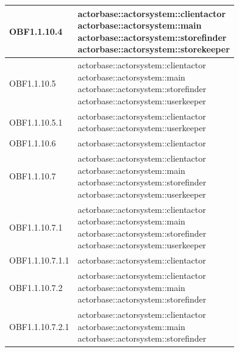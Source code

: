 \documentclass{scalatekids-article}
\begin{document}
\begin{longtable}[H]{|p{3.5cm}|p{7.5cm}|}
  \hline
  OBF1.1.10.4 & \multiLineCell[t]{actorbase::actorsystem::clientactor\\actorbase::actorsystem::main\\actorbase::actorsystem::storefinder\\actorbase::actorsystem::storekeeper\\}\\
  \hline
  OBF1.1.10.5 & \multiLineCell[t]{actorbase::actorsystem::clientactor\\actorbase::actorsystem::main\\actorbase::actorsystem::storefinder\\actorbase::actorsystem::userkeeper\\}\\
  \hline
  OBF1.1.10.5.1 & \multiLineCell[t]{actorbase::actorsystem::clientactor\\actorbase::actorsystem::userkeeper\\}\\
  \hline
  OBF1.1.10.6 & \multiLineCell[t]{actorbase::actorsystem::clientactor\\}\\
  \hline
  OBF1.1.10.7 & \multiLineCell[t]{actorbase::actorsystem::clientactor\\actorbase::actorsystem::main\\actorbase::actorsystem::storefinder\\actorbase::actorsystem::userkeeper\\}\\
  \hline
  OBF1.1.10.7.1 & \multiLineCell[t]{actorbase::actorsystem::clientactor\\actorbase::actorsystem::main\\actorbase::actorsystem::storefinder\\actorbase::actorsystem::userkeeper\\}\\
  \hline
  OBF1.1.10.7.1.1 & \multiLineCell[t]{actorbase::actorsystem::clientactor\\}\\
  \hline
  OBF1.1.10.7.2 & \multiLineCell[t]{actorbase::actorsystem::clientactor\\actorbase::actorsystem::main\\actorbase::actorsystem::storefinder\\}\\
  \hline
  OBF1.1.10.7.2.1 & \multiLineCell[t]{actorbase::actorsystem::clientactor\\actorbase::actorsystem::main\\actorbase::actorsystem::storefinder\\}\\

\end{longtable}
\end{document}
